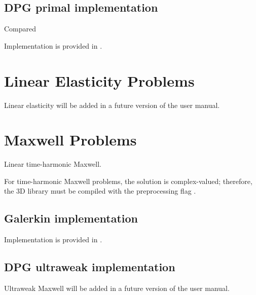 \subsection{DPG primal implementation}
\label{subsec:poisson-ultraweak}

Compared

Implementation is provided in .

\section{Linear Elasticity Problems}
\label{sec:elasticity}


Linear elasticity will be added in a future version of the user manual.

\section{Maxwell Problems}
\label{sec:maxwell}

Linear time-harmonic Maxwell.

For time-harmonic Maxwell problems, the solution is complex-valued; therefore, the \hp3D library must be compiled with the preprocessing flag .

\subsection{Galerkin implementation}
\label{subsec:maxwell-galerkin}

Implementation is provided in .

\subsection{DPG ultraweak implementation}
\label{subsec:maxwell-galerkin}

Ultraweak Maxwell will be added in a future version of the user manual.



%


